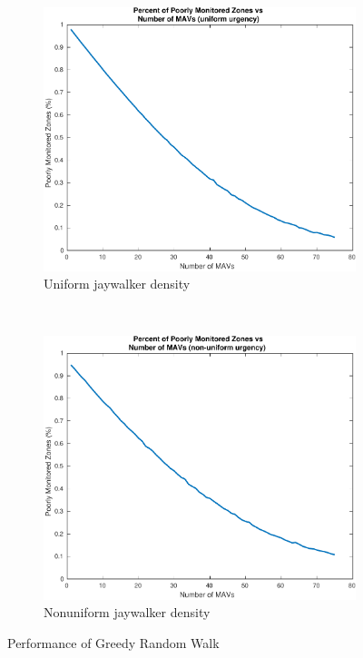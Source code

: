\documentclass{article}
\begin{document}
\begin{figure}[H]
\center
\begin{subfigure}[b]{0.5\textwidth}
  \center
  \includegraphics[width=\textwidth]{figures/random_walk_part1-crop.pdf}
  \caption{Uniform jaywalker density}
  \label{fig:random_uniform}
\end{subfigure}~
\begin{subfigure}[b]{0.5\textwidth}
  \center
  \includegraphics[width=\textwidth]{figures/random_walk_part3-crop.pdf}
  \caption{Nonuniform jaywalker density}
  \label{fig:random_nonuniform}
\end{subfigure}
\caption{Performance of Greedy Random Walk}
\label{fig:greedy_performance}
\end{figure}
\end{document}
